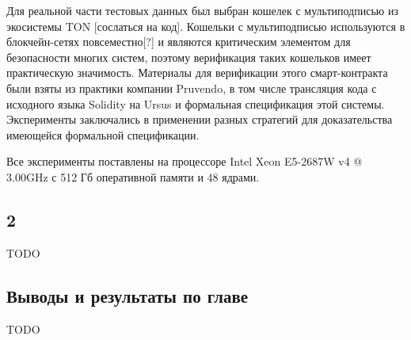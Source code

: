 \documentclass[../diploma.tex]{subfiles}
\begin{document}
Для реальной части тестовых данных был выбран кошелек с мультиподписью из экосистемы TON [сослаться на код]. Кошельки с мультиподписью используются в блокчейн-сетях повсеместно[?] и являются критическим элементом для безопасности многих систем, поэтому верификация таких кошельков имеет практическую значимость. Материалы для верификации этого смарт-контракта были взяты из практики компании Pruvendo, в том числе трансляция кода с исходного языка Solidity на Ursus и формальная спецификация этой системы. Эксперименты заключались в применении разных стратегий для доказательства имеющейся формальной спецификации.

Все эксперименты поставлены на процессоре Intel Xeon E5-2687W v4 @ 3.00GHz с 512 Гб оперативной памяти и 48 ядрами.

\subsection{2}

TODO

\subsection{Выводы и результаты по главе}

TODO
\end{document}
